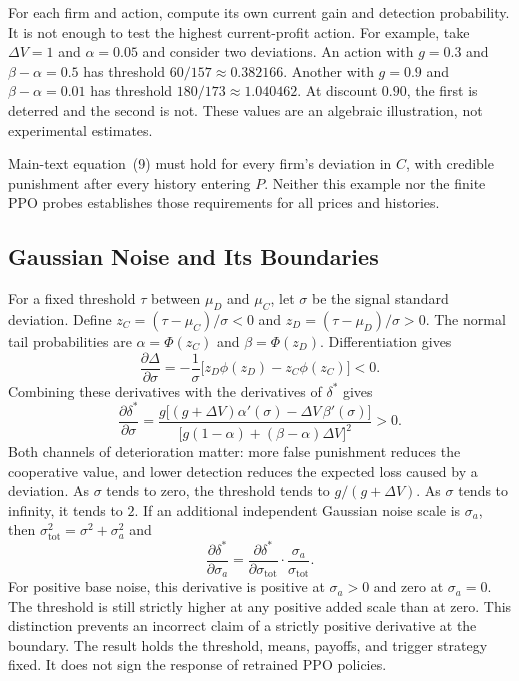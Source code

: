 For each firm and action, compute its own current gain and detection probability. It is not enough to test the highest current-profit action. For example, take $\Delta V = 1$ and $\alpha = 0.05$ and consider two deviations. An action with $g = 0.3$ and $\beta - \alpha = 0.5$ has threshold $60/157 \approx 0.382166$. Another with $g = 0.9$ and $\beta - \alpha = 0.01$ has threshold $180/173 \approx 1.040462$. At discount $0.90$, the first is deterred and the second is not. These values are an algebraic illustration, not experimental estimates.

Main-text equation~(9) must hold for every firm's deviation in $C$, with credible punishment after every history entering $P$. Neither this example nor the finite PPO probes establishes those requirements for all prices and histories.

\subsection{Gaussian Noise and Its Boundaries}

For a fixed threshold $\tau$ between $\mu_D$ and $\mu_C$, let $\sigma$ be the signal standard deviation. Define $z_C = (\tau - \mu_C)/\sigma < 0$ and $z_D = (\tau - \mu_D)/\sigma > 0$. The normal tail probabilities are $\alpha = \Phi(z_C)$ and $\beta = \Phi(z_D)$. Differentiation gives
\[
\frac{\partial \Delta}{\partial \sigma} = -\frac{1}{\sigma}\bigl[z_D \phi(z_D) - z_C \phi(z_C)\bigr] < 0.
\]
Combining these derivatives with the derivatives of $\delta^*$ gives
\[
\frac{\partial \delta^*}{\partial \sigma} = \frac{g\bigl[(g + \Delta V)\alpha'(\sigma) - \Delta V\,\beta'(\sigma)\bigr]}{\bigl[g(1-\alpha) + (\beta-\alpha)\Delta V\bigr]^2} > 0.
\]
Both channels of deterioration matter: more false punishment reduces the cooperative value, and lower detection reduces the expected loss caused by a deviation. As $\sigma$ tends to zero, the threshold tends to $g/(g + \Delta V)$. As $\sigma$ tends to infinity, it tends to $2$. If an additional independent Gaussian noise scale is $\sigma_a$, then $\sigma_{\mathrm{tot}}^2 = \sigma^2 + \sigma_a^2$ and
\[
\frac{\partial \delta^*}{\partial \sigma_a} = \frac{\partial \delta^*}{\partial \sigma_{\mathrm{tot}}} \cdot \frac{\sigma_a}{\sigma_{\mathrm{tot}}}.
\]
For positive base noise, this derivative is positive at $\sigma_a > 0$ and zero at $\sigma_a = 0$. The threshold is still strictly higher at any positive added scale than at zero. This distinction prevents an incorrect claim of a strictly positive derivative at the boundary. The result holds the threshold, means, payoffs, and trigger strategy fixed. It does not sign the response of retrained PPO policies.

